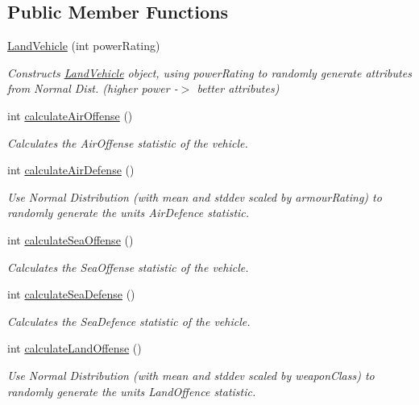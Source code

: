 \subsection*{Public Member Functions}
\begin{DoxyCompactItemize}
\item 
\mbox{\hyperlink{class_land_vehicle_ad87bb4a1d05b0ef2cd076c50194bd612}{Land\+Vehicle}} (int power\+Rating)
\begin{DoxyCompactList}\small\item\em Constructs \mbox{\hyperlink{class_land_vehicle}{Land\+Vehicle}} object, using power\+Rating to randomly generate attributes from Normal Dist. (higher power -\/$>$ better attributes) \end{DoxyCompactList}\item 
int \mbox{\hyperlink{class_land_vehicle_a2453f77778b1c36b2b2fbeb19d06776e}{calculate\+Air\+Offense}} ()
\begin{DoxyCompactList}\small\item\em Calculates the Air\+Offense statistic of the vehicle. \end{DoxyCompactList}\item 
int \mbox{\hyperlink{class_land_vehicle_af5083b44d73c3597be9ab081d06bc7a6}{calculate\+Air\+Defense}} ()
\begin{DoxyCompactList}\small\item\em Use Normal Distribution (with mean and stddev scaled by armour\+Rating) to randomly generate the unit\textquotesingle{}s Air\+Defence statistic. \end{DoxyCompactList}\item 
int \mbox{\hyperlink{class_land_vehicle_a679b1e2f608cdfad427449240a504999}{calculate\+Sea\+Offense}} ()
\begin{DoxyCompactList}\small\item\em Calculates the Sea\+Offense statistic of the vehicle. \end{DoxyCompactList}\item 
int \mbox{\hyperlink{class_land_vehicle_a5a07a90d8307b0ac44e2caacb84eb64e}{calculate\+Sea\+Defense}} ()
\begin{DoxyCompactList}\small\item\em Calculates the Sea\+Defence statistic of the vehicle. \end{DoxyCompactList}\item 
int \mbox{\hyperlink{class_land_vehicle_ae8604789808fddcd4e58122c11ee18cd}{calculate\+Land\+Offense}} ()
\begin{DoxyCompactList}\small\item\em Use Normal Distribution (with mean and stddev scaled by weapon\+Class) to randomly generate the unit\textquotesingle{}s Land\+Offence statistic. \end{DoxyCompactList}\item 

\end{DoxyCompactItemize}
